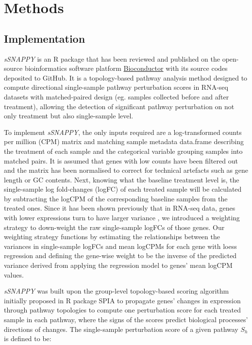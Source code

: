\documentclass[9pt,a4paper,]{extarticle}
\begin{document}
\hypertarget{methods}{%
\section{Methods}\label{methods}}

\hypertarget{implementation}{%
\subsection{Implementation}\label{implementation}}

\emph{sSNAPPY} is an R package that has been reviewed and published on the open-source bioinformatics software platform \href{https://bioconductor.org/packages/release/bioc/html/*sSNAPPY*.html}{Bioconductor} with its source codes deposited to GitHub. It is a topology-based pathway analysis method designed to compute directional single-sample pathway perturbation scores in RNA-seq datasets with matched-paired design (eg. samples collected before and after treatment), allowing the detection of significant pathway perturbation on not only treatment but also single-sample level.

To implement \emph{sSNAPPY}, the only inputs required are a log-transformed counts per million (CPM) matrix and matching sample metadata data.frame describing the treatment of each sample and the categorical variable grouping samples into matched pairs. It is assumed that genes with low counts have been filtered out and the matrix has been normalised to correct for technical artefacts such as gene length or GC contents. Next, knowing what the baseline treatment level is, the single-sample log fold-changes (logFC) of each treated sample will be calculated by subtracting the logCPM of the corresponding baseline samples from the treated ones. Since it has been shown previously that in RNA-seq data, genes with lower expressions turn to have larger variance\citep{Law2014} , we introduced a weighting strategy to down-weight the raw single-sample logFCs of those genes. Our weighting strategy functions by estimating the relationships between the variances in single-sample logFCs and mean logCPMs for each gene with loess regression and defining the gene-wise weight to be the inverse of the predicted variance derived from applying the regression model to genes' mean logCPM values.

\emph{sSNAPPY} was built upon the group-level topology-based scoring algorithm initially proposed in R package SPIA\citep{Tarca2009} to propagate genes' changes in expression through pathway topologies to compute one perturbation score for each treated sample in each pathway, where the signs of the scores predict biological processes' directions of changes. The single-sample perturbation score of a given pathway \(S_{h}\) is defined to be:
\end{document}
